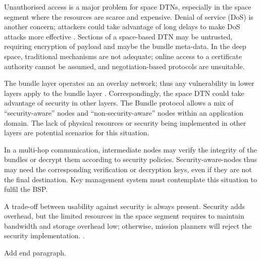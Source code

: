 Unauthorised access is a major problem for space DTNs, especially in the space segment where the resources are scarce and expensive. Denial of service (DoS) is another concern; attackers could take advantage of long delays to make DoS attacks more effective \cite{rfc6257}. Sections of a space-based DTN may be untrusted, requiring encryption of payload and maybe the bundle meta-data. In the deep space, traditional mechanisms are not adequate; online access to a certificate authority cannot be assumed, and negotiation-based protocols are unsuitable.
 
 
The bundle layer operates an an overlay network; thus any vulnerability in lower layers apply to the bundle layer \cite{rfc6257}. Correspondingly, the space DTN could take advantage of security in other layers. The Bundle protocol allows a mix of ``security-aware'' nodes and ``non-security-aware'' nodes within an application domain. The lack of physical resources or security being implemented in other layers are potential scenarios for this situation. 

In a multi-hop communication, intermediate nodes may verify the integrity of the bundles or decrypt them according to security policies. Security-aware-nodes thus may need the corresponding verification or decryption keys, even if they are not the final destination. Key management system must contemplate this situation to fulfil the BSP.

A trade-off between usability against security is always present. Security adds overhead, but the limited resources in the space segment requires to maintain bandwidth and storage overhead low; otherwise, mission planners will reject the security implementation. \cite{book2012architecture}.

Add end paragraph.










